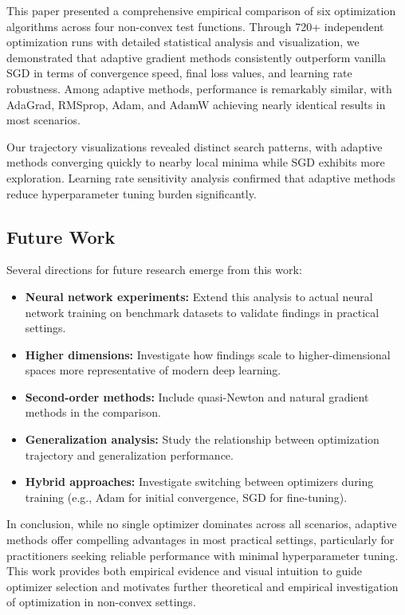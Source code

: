 \documentclass[12pt,a4paper]{article}
\begin{document}
This paper presented a comprehensive empirical comparison of six optimization algorithms across four non-convex test functions. Through 720+ independent optimization runs with detailed statistical analysis and visualization, we demonstrated that adaptive gradient methods consistently outperform vanilla SGD in terms of convergence speed, final loss values, and learning rate robustness. Among adaptive methods, performance is remarkably similar, with AdaGrad, RMSprop, Adam, and AdamW achieving nearly identical results in most scenarios.

Our trajectory visualizations revealed distinct search patterns, with adaptive methods converging quickly to nearby local minima while SGD exhibits more exploration. Learning rate sensitivity analysis confirmed that adaptive methods reduce hyperparameter tuning burden significantly.

\subsection{Future Work}

Several directions for future research emerge from this work:

\begin{itemize}
    \item \textbf{Neural network experiments:} Extend this analysis to actual neural network training on benchmark datasets to validate findings in practical settings.
    \item \textbf{Higher dimensions:} Investigate how findings scale to higher-dimensional spaces more representative of modern deep learning.
    \item \textbf{Second-order methods:} Include quasi-Newton and natural gradient methods in the comparison.
    \item \textbf{Generalization analysis:} Study the relationship between optimization trajectory and generalization performance.
    \item \textbf{Hybrid approaches:} Investigate switching between optimizers during training (e.g., Adam for initial convergence, SGD for fine-tuning).
\end{itemize}

In conclusion, while no single optimizer dominates across all scenarios, adaptive methods offer compelling advantages in most practical settings, particularly for practitioners seeking reliable performance with minimal hyperparameter tuning. This work provides both empirical evidence and visual intuition to guide optimizer selection and motivates further theoretical and empirical investigation of optimization in non-convex settings.
\end{document}
